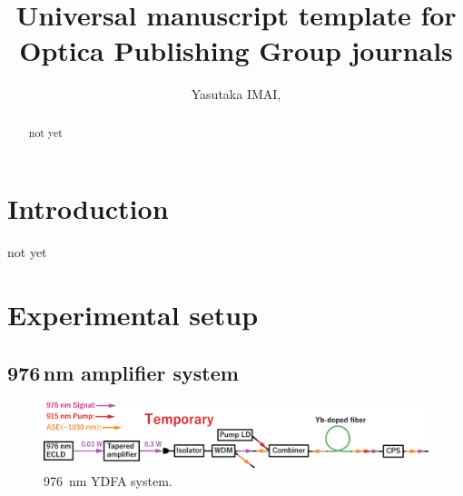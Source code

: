 \documentclass{osa-article}
\begin{document}
\title{Universal manuscript template for Optica Publishing Group journals}

\author{Yasutaka IMAI,}

\address{Reserch Institute for Interdisciplinary Science, Okayama University, Okayama, Japan}

\begin{abstract}
not yet
\end{abstract}

\section{Introduction}
not yet

\section{Experimental setup}
\subsection{976\,nm amplifier system}

\begin{figure}[h!]
  \centering\includegraphics[width=\linewidth]{./Figure/976nmYDFASystem.eps}
  \caption{\SI{976}{\nm} YDFA system.}
  \label{fig:976YDFASystem}
\end{figure}
\end{document}
